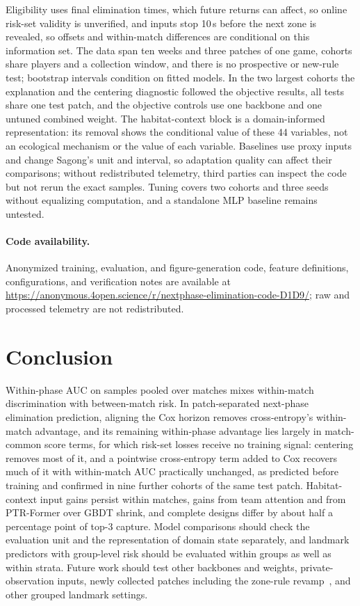 \documentclass[sigconf,anonymous,nonacm]{acmart}
\newcommand{\artifacturl}{\url{https://anonymous.4open.science/r/nextphase-elimination-code-D1D9/}}
\begin{document}
Eligibility uses final elimination times, which future returns can affect, so online risk-set validity is unverified, and inputs stop 10\,s before the next zone is revealed, so offsets and within-match differences are conditional on this information set. The data span ten weeks and three patches of one game, cohorts share players and a collection window, and there is no prospective or new-rule test; bootstrap intervals condition on fitted models. In the two largest cohorts the explanation and the centering diagnostic followed the objective results, all tests share one test patch, and the objective controls use one backbone and one untuned combined weight. The habitat-context block is a domain-informed representation: its removal shows the conditional value of these 44 variables, not an ecological mechanism or the value of each variable. Baselines use proxy inputs and change Sagong's unit and interval, so adaptation quality can affect their comparisons; without redistributed telemetry, third parties can inspect the code but not rerun the exact samples. Tuning covers two cohorts and three seeds without equalizing computation, and a standalone MLP baseline remains untested.

\paragraph{Code availability.}
Anonymized training, evaluation, and figure-generation code, feature definitions, configurations, and verification notes are available at \artifacturl{}; raw and processed telemetry are not redistributed.

\section{Conclusion}
\label{sec:conclusion}
Within-phase AUC on samples pooled over matches mixes within-match discrimination with between-match risk. In patch-separated next-phase elimination prediction, aligning the Cox horizon removes cross-entropy's within-match advantage, and its remaining within-phase advantage lies largely in match-common score terms, for which risk-set losses receive no training signal: centering removes most of it, and a pointwise cross-entropy term added to Cox recovers much of it with within-match AUC practically unchanged, as predicted before training and confirmed in nine further cohorts of the same test patch. Habitat-context input gains persist within matches, gains from team attention and from PTR-Former over GBDT shrink, and complete designs differ by about half a percentage point of top-3 capture. Model comparisons should check the evaluation unit and the representation of domain state separately, and landmark predictors with group-level risk should be evaluated within groups as well as within strata. Future work should test other backbones and weights, private-observation inputs, newly collected patches including the zone-rule revamp~\cite{PUBGBlueZone2026}, and other grouped landmark settings.
\end{document}
